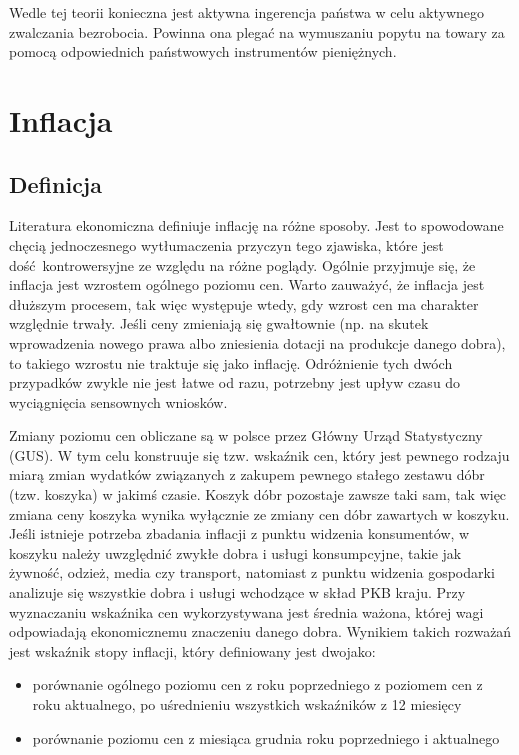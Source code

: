 \documentclass[12pt]{extarticle}
\begin{document}
Wedle tej teorii konieczna jest aktywna ingerencja państwa w celu aktywnego zwalczania bezrobocia. Powinna ona plegać na wymuszaniu popytu na towary za pomocą odpowiednich państwowych instrumentów pieniężnych.

\section{Inflacja}

\subsection{Definicja}

Literatura ekonomiczna definiuje inflację na różne sposoby. Jest to spowodowane chęcią jednoczesnego wytłumaczenia przyczyn tego zjawiska, które jest dość kontrowersyjne ze względu na różne poglądy. Ogólnie przyjmuje się, że inflacja jest wzrostem ogólnego poziomu cen. Warto zauważyć, że inflacja jest dłuższym procesem, tak więc występuje wtedy, gdy wzrost cen ma charakter względnie trwały. Jeśli ceny zmieniają się gwałtownie (np. na skutek wprowadzenia nowego prawa albo zniesienia dotacji na produkcje danego dobra), to takiego wzrostu nie traktuje się jako inflację. Odróżnienie tych dwóch przypadków zwykle nie jest łatwe od razu, potrzebny jest upływ czasu do wyciągnięcia sensownych wniosków.

Zmiany poziomu cen obliczane są w polsce przez Główny Urząd Statystyczny (GUS). W tym celu konstruuje się tzw. wskaźnik cen, który jest pewnego rodzaju miarą zmian wydatków związanych z zakupem pewnego stałego zestawu dóbr (tzw. koszyka) w jakimś czasie. Koszyk dóbr pozostaje zawsze taki sam, tak więc zmiana ceny koszyka wynika wyłącznie ze zmiany cen dóbr zawartych w koszyku. Jeśli istnieje potrzeba zbadania inflacji z punktu widzenia konsumentów, w koszyku należy uwzględnić zwykłe dobra i usługi konsumpcyjne, takie jak żywność, odzież, media czy transport, natomiast z punktu widzenia gospodarki analizuje się wszystkie dobra i usługi wchodzące w skład PKB kraju. Przy wyznaczaniu wskaźnika cen wykorzystywana jest średnia ważona, której wagi odpowiadają ekonomicznemu znaczeniu danego dobra. Wynikiem takich rozważań jest wskaźnik stopy inflacji, który definiowany jest dwojako: 


\begin{itemize}
	\item porównanie ogólnego poziomu cen z roku poprzedniego z poziomem cen z roku aktualnego, po uśrednieniu wszystkich wskaźników z 12 miesięcy
    \item porównanie poziomu cen z miesiąca grudnia roku poprzedniego i aktualnego
\end{itemize}
\end{document}
